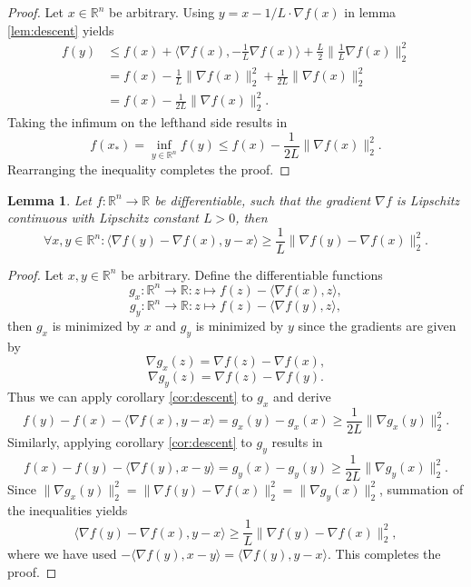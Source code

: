 \documentclass[11pt, a4paper]{article}
\newtheorem{lemma}[theorem]{Lemma}
\newcommand{\R}{\mathds{R}}
\begin{document}
\begin{proof}
Let $x \in \R^n$ be arbitrary. Using $y = x - 1/L \cdot \nabla f(x)$ in lemma \ref{lem:descent} yields
\[ \begin{split} 
f(y) 
&\leq f(x) + \big \langle \nabla f(x) , - \frac{1}{L} \nabla f(x) \big \rangle + \frac{L}{2} \big \| \frac{1}{L} \nabla f(x) \big \|_2^2 \\\
&= f(x) - \frac{1}{L} \big \| \nabla f(x) \big \|_2^2 + \frac{1}{2L} \big \| \nabla f(x) \big \|_2^2 \\\
&= f(x) - \frac{1}{2L} \big \| \nabla f(x) \big \|_2^2.
\end{split} \]
Taking the infimum on the lefthand side results in
\[ f(x_*) = \inf_{y \in \R^n} f(y) \leq f(x) - \frac{1}{2L} \big \| \nabla f(x) \big \|_2^2. \]
Rearranging the inequality completes the proof.
\end{proof}

\begin{lemma} \label{lem:coercivity}
Let $f: \R^n \to \R$ be differentiable, such that the gradient $\nabla f$ is Lipschitz continuous with Lipschitz constant $L>0$, then
\[ \forall x,y \in \R^n : \big \langle \nabla f(y) - \nabla f(x),y-x \big \rangle \geq \frac{1}{L} \big \| \nabla f(y) - \nabla f(x) \big \|_2^2. \]
\end{lemma}

\begin{proof}
Let $x,y \in \R^n$ be arbitrary. Define the differentiable functions
\[ g_x: \R^n \to \R : z \mapsto f(z) - \big \langle \nabla f(x), z \big \rangle, \]
\[ g_y: \R^n \to \R : z \mapsto f(z) - \big \langle \nabla f(y), z \big \rangle, \]
then $g_x$ is minimized by $x$ and $g_y$ is minimized by $y$ since the gradients are given by
\[ \nabla g_x(z) = \nabla f(z) - \nabla f(x), \]
\[ \nabla g_y(z) = \nabla f(z) - \nabla f(y). \]
Thus we can apply corollary \ref{cor:descent} to $g_x$ and derive
\[ f(y) - f(x) - \big \langle \nabla f(x) , y-x \big \rangle = g_x(y) - g_x(x) \geq \frac{1}{2L} \big \| \nabla g_x(y) \big \|_2^2. \]
Similarly, applying corollary \ref{cor:descent} to $g_y$ results in
\[ f(x) - f(y) - \big \langle \nabla f(y) , x-y \big \rangle = g_y(x) - g_y(y) \geq \frac{1}{2L} \big \| \nabla g_y(x) \big \|_2^2. \]
Since $ \big \| \nabla g_x(y) \big \|_2^2 = \big \| \nabla f(y) - \nabla f(x) \big \|_2^2 = \big \| \nabla g_y(x) \big \|_2^2$, summation of the inequalities yields
\[ \big \langle \nabla f(y) - \nabla f(x),y-x \big \rangle \geq \frac{1}{L} \big \| \nabla f(y) - \nabla f(x) \big \|_2^2, \]
where we have used $- \big \langle \nabla f(y) , x-y \big \rangle = \big \langle \nabla f(y) , y-x \big \rangle$. This completes the proof.
\end{proof}
\end{document}
